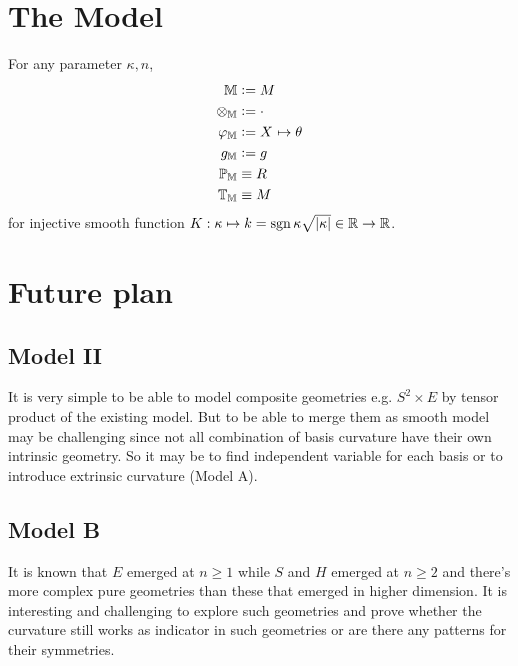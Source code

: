 \documentclass[stu, babel, american, biblatex, a4paper, leqno, draftall]{apa7}
\begin{document}
\section{The Model}
\begin{ModelGroupElement}
    For any parameter $\kappa, n$,
    \begin{align*}
        \elements                   & \defeq M                                    \\
        \groupoperation{\elements}  & \defeq \cdot                                \\
        \charts{\elements}          & \defeq \tensor{X}{}\mapsto\tensor{\theta}{} \\
        \innerprod{\elements}       & \defeq g                                    \\
        \points{\elements}          & \equiv R                                    \\
        \transformations{\elements} & \equiv M                                    \\
    \end{align*}
    for injective smooth function $K:\kappa \mapsto k = \operatorname{sgn}{\kappa}\sqrt{\lvert\kappa\rvert}\in\mathbb{R}\to\mathbb{R}$.
\end{ModelGroupElement}
\begin{ModelGroupAssertion}
\end{ModelGroupAssertion}
\begin{ModelCurvatureAssertion}
\end{ModelCurvatureAssertion}
\section{Future plan}
\subsection{Model II}
It is very simple to be able to model composite geometries e.g. $S^2 \times E$ by tensor product of the existing model. But to be able to merge them as smooth model may be challenging since not all combination of basis curvature have their own intrinsic geometry. So it may be to find independent variable for each basis or to introduce extrinsic curvature (Model A).
\subsection{Model B}
It is known that $E$ emerged at $n\ge1$ while $S$ and $H$ emerged at $n\ge2$ and there's more complex pure geometries than these that emerged in higher dimension. It is interesting and challenging to explore such geometries and prove whether the curvature still works as indicator in such geometries or are there any patterns for their symmetries.
\end{document}
